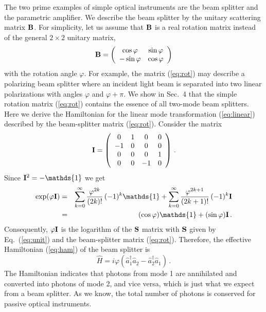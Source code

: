 \documentclass[12pt,amsmath,amssymb]{article}
\def\underline#1{{\bf #1}}
\numberwithin{equation}{section}
\begin{document}
The two prime examples of simple optical instruments are the beam
splitter and the parametric amplifier. We describe the beam
splitter by the unitary scattering matrix $\underline{B}$. For
simplicity, let us assume that $\underline{B}$ is a real rotation
matrix instead of the general $2 \times 2$ unitary matrix,
\begin{equation}
\label{eq:rot} \underline{B} = \left(
    \begin{array}{cc}
      \cos\varphi & \sin\varphi \\
       -\sin\varphi & \cos\varphi
    \end{array}
\right)
\end{equation}
with the rotation angle $\varphi$. For example, the matrix
(\ref{eq:rot}) may describe a polarizing beam splitter where an
incident light beam is separated into two linear polarizations
with angles $\varphi$ and $\varphi+\pi$. We show in Sec.\ 4 that
the simple rotation matrix (\ref{eq:rot}) contains the essence of
all two-mode beam splitters. Here we derive the Hamiltonian for
the linear mode transformation (\ref{eq:linear}) described by the
beam-splitter matrix (\ref{eq:rot}). Consider the matrix
\begin{equation}
\underline{I} =
    \left(
    \begin{array}{cccc}
      0&1&0&0\\-1&0&0&0\\0&0&0&1\\0&0&-1&0
    \end{array}
\right) \,.
\end{equation}
Since $\underline{I}^2 = -\mathds{1}$ we get
\begin{eqnarray}
\exp(\varphi\underline{I}) &=& \sum_{k=0}^\infty
\frac{\varphi^{2k}}{(2k)!}\,(-1)^k \mathds{1} + \sum_{k=0}^\infty
\frac{\varphi^{2k+1}}{(2k+1)!}\,(-1)^k \underline{I} \nonumber\\
&=& (\cos\varphi)\mathds{1} + (\sin\varphi) \underline{I} \,.
\end{eqnarray}
Consequently, $\varphi\underline{I}$ is the logarithm of the
$\underline{S}$ matrix with $\underline{S}$ given by Eq.\
(\ref{eq:unit}) and the beam-splitter matrix (\ref{eq:rot}).
Therefore, the effective Hamiltonian
(\ref{eq:ham}) of the beam splitter is
\begin{equation}
\label{eq:hbeam} \hat{H} =
i\varphi\left(\hat{a}_1^\dagger\hat{a}_2 -
\hat{a}_2^\dagger\hat{a}_1\right) \,.
\end{equation}
The Hamiltonian indicates that photons from mode 1 are
annihilated and converted into photons of mode 2, and vice versa,
which is just what we expect from a beam splitter.
As we know, the total
number of photons is conserved for passive optical instruments.
\end{document}

